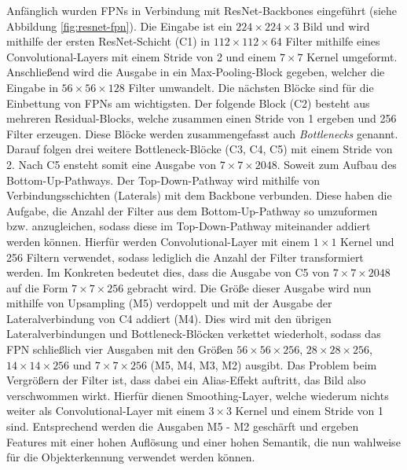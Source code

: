 Anfänglich wurden FPNs in Verbindung mit ResNet-Backbones eingeführt (siehe
Abbildung \ref{fig:resnet-fpn}). Die Eingabe ist ein $224 \times 224 \times 3$
Bild und wird mithilfe der ersten ResNet-Schicht (C1) in $112 \times 112 \times
64$ Filter mithilfe eines Convolutional-Layers mit einem Stride von 2 und einem
$7 \times 7$ Kernel umgeformt. Anschließend wird die Ausgabe in ein
Max-Pooling-Block gegeben, welcher die Eingabe in $56 \times 56 \times 128$
Filter umwandelt. Die nächsten Blöcke sind für die Einbettung von FPNs am
wichtigsten. Der folgende Block (C2) besteht aus mehreren Residual-Blocks,
welche zusammen einen Stride von 1 ergeben und 256 Filter erzeugen. Diese Blöcke
werden zusammengefasst auch \textit{Bottlenecks} genannt. Darauf folgen drei
weitere Bottleneck-Blöcke (C3, C4, C5) mit einem Stride von 2. Nach C5 ensteht
somit eine Ausgabe von $7 \times 7 \times 2048$. Soweit zum Aufbau des
Bottom-Up-Pathways. Der Top-Down-Pathway wird mithilfe von Verbindungsschichten
(Laterals) mit dem Backbone verbunden. Diese haben die Aufgabe, die Anzahl der
Filter aus dem Bottom-Up-Pathway so umzuformen bzw. anzugleichen, sodass diese
im Top-Down-Pathway miteinander addiert werden können. Hierfür werden
Convolutional-Layer mit einem $1 \times 1$ Kernel und 256 Filtern verwendet,
sodass lediglich die Anzahl der Filter transformiert werden. Im Konkreten
bedeutet dies, dass die Ausgabe von C5 von $7 \times 7 \times 2048$ auf die Form
$7 \times 7 \times 256$ gebracht wird.  Die Größe dieser Ausgabe wird nun
mithilfe von Upsampling (M5) verdoppelt und mit der Ausgabe der
Lateralverbindung von C4 addiert (M4). Dies wird mit den übrigen
Lateralverbindungen und Bottleneck-Blöcken verkettet wiederholt, sodass das FPN
schließlich vier Ausgaben mit den Größen $56 \times 56 \times 256$, $28 \times
28 \times 256$, $14 \times 14 \times 256$ und $7 \times 7 \times 256$ (M5, M4,
M3, M2) ausgibt. Das Problem beim Vergrößern der Filter ist, dass dabei ein
Alias-Effekt auftritt, das Bild also verschwommen wirkt. Hierfür dienen
Smoothing-Layer, welche wiederum nichts weiter als Convolutional-Layer mit einem
$3 \times 3$ Kernel und einem Stride von 1 sind. Entsprechend werden die
Ausgaben M5 - M2 geschärft und ergeben Features mit einer hohen Auflösung und
einer hohen Semantik, die nun wahlweise für die Objekterkennung verwendet werden
können.

